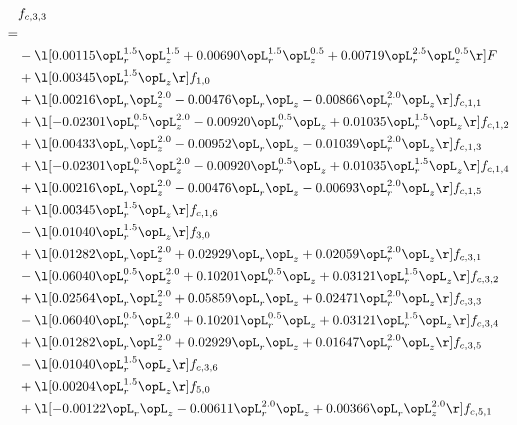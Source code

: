 \begin{alignat}{2} 
\label{eq:f_33_1} 
& f_{c,3,3} \nonumber \\ 
 = \\ 
& - \l[  0.00115 \opL_r^{1.5} \opL_z^{1.5} +  0.00690 \opL_r^{1.5} \opL_z^{0.5} +  0.00719 \opL_r^{2.5} \opL_z^{0.5}  \r] F \nonumber \\ 
& + \l[  0.00345 \opL_r^{1.5} \opL_z  \r] f_{1,0} \nonumber \\ 
& + \l[  0.00216 \opL_r \opL_z^{2.0}   -0.00476 \opL_r \opL_z   -0.00866 \opL_r^{2.0} \opL_z  \r] f_{c,1,1} \nonumber \\ 
& + \l[  -0.02301 \opL_r^{0.5} \opL_z^{2.0}   -0.00920 \opL_r^{0.5} \opL_z +  0.01035 \opL_r^{1.5} \opL_z  \r] f_{c,1,2} \nonumber \\ 
& + \l[  0.00433 \opL_r \opL_z^{2.0}   -0.00952 \opL_r \opL_z   -0.01039 \opL_r^{2.0} \opL_z  \r] f_{c,1,3} \nonumber \\ 
& + \l[  -0.02301 \opL_r^{0.5} \opL_z^{2.0}   -0.00920 \opL_r^{0.5} \opL_z +  0.01035 \opL_r^{1.5} \opL_z  \r] f_{c,1,4} \nonumber \\ 
& + \l[  0.00216 \opL_r \opL_z^{2.0}   -0.00476 \opL_r \opL_z   -0.00693 \opL_r^{2.0} \opL_z  \r] f_{c,1,5} \nonumber \\ 
& + \l[  0.00345 \opL_r^{1.5} \opL_z  \r] f_{c,1,6} \nonumber \\ 
& - \l[  0.01040 \opL_r^{1.5} \opL_z  \r] f_{3,0} \nonumber \\ 
& + \l[  0.01282 \opL_r \opL_z^{2.0} +  0.02929 \opL_r \opL_z +  0.02059 \opL_r^{2.0} \opL_z  \r] f_{c,3,1} \nonumber \\ 
& - \l[  0.06040 \opL_r^{0.5} \opL_z^{2.0} +  0.10201 \opL_r^{0.5} \opL_z +  0.03121 \opL_r^{1.5} \opL_z  \r] f_{c,3,2} \nonumber \\ 
& + \l[  0.02564 \opL_r \opL_z^{2.0} +  0.05859 \opL_r \opL_z +  0.02471 \opL_r^{2.0} \opL_z  \r] f_{c,3,3} \nonumber \\ 
& - \l[  0.06040 \opL_r^{0.5} \opL_z^{2.0} +  0.10201 \opL_r^{0.5} \opL_z +  0.03121 \opL_r^{1.5} \opL_z  \r] f_{c,3,4} \nonumber \\ 
& + \l[  0.01282 \opL_r \opL_z^{2.0} +  0.02929 \opL_r \opL_z +  0.01647 \opL_r^{2.0} \opL_z  \r] f_{c,3,5} \nonumber \\ 
& - \l[  0.01040 \opL_r^{1.5} \opL_z  \r] f_{c,3,6} \nonumber \\ 
& + \l[  0.00204 \opL_r^{1.5} \opL_z  \r] f_{5,0} \nonumber \\ 
& + \l[  -0.00122 \opL_r \opL_z   -0.00611 \opL_r^{2.0} \opL_z +  0.00366 \opL_r \opL_z^{2.0}  \r] f_{c,5,1} \nonumber \\ 

\end{alignat}
